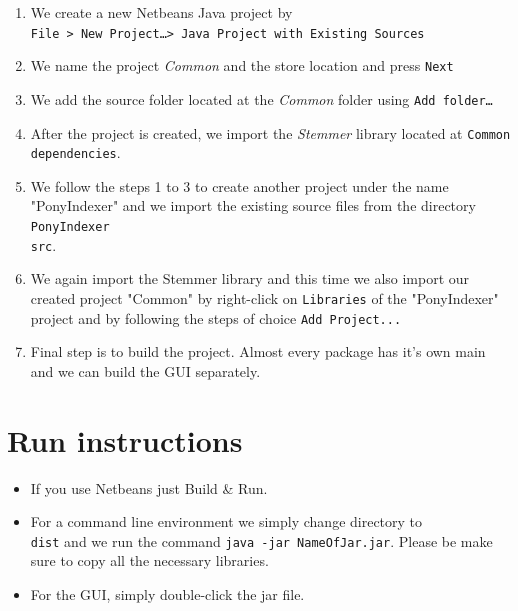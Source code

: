 \documentclass[letterpaper,twocolumn,10pt]{article}
\begin{document}
\begin{enumerate}
	\item We create a new Netbeans Java project by \\
				{\tt File > New Project\ldots  > Java Project with Existing Sources }
	\item We name the project \emph{ Common} and the store location and press
				{\tt Next}
	\item We add the source folder located at the \emph{ Common} folder
				using {\tt Add folder\ldots}
	\item After the project is created, we import the \emph{ Stemmer} library
				located at {\tt Common\\dependencies}.
	\item We follow the steps 1 to 3 to create another project under the name "PonyIndexer" and we import the existing source files from the directory {\tt PonyIndexer\\src}.
	\item We again import the Stemmer library and this time we also import our created project "Common" by right-click on {\tt Libraries} of the "PonyIndexer" project and by following the steps of choice {\tt Add Project...}
	\item Final step is to build the project. Almost every package has it's own main and we can build the GUI separately.
\end{enumerate}

\section{Run instructions}
\begin{itemize}
	\item If you use Netbeans just Build \& Run.
	\item For a command line environment we simply change directory to {\tt \\dist} and we run the command {\tt java -jar NameOfJar.jar}. Please be make sure to copy all the necessary libraries.
	\item For the GUI, simply double-click the jar file.
\end{itemize}
\end{document}
